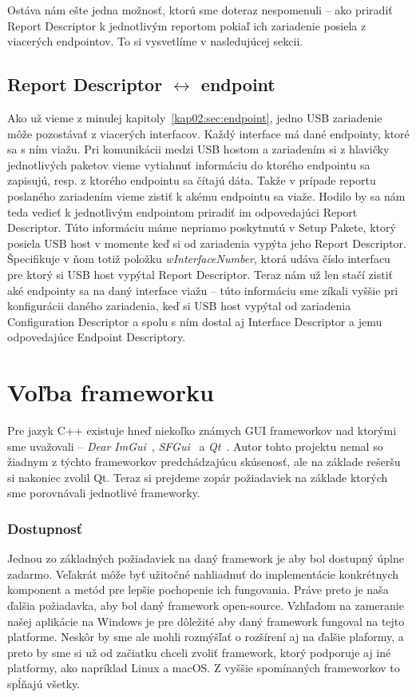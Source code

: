 Ostáva nám ešte jedna možnosť, ktorú sme doteraz nespomenuli -- ako priradiť Report Descriptor k jednotlivým reportom pokiaľ ich zariadenie posiela z viacerých endpointov. To si vysvetlíme v nasledujúcej sekcii.

\subsection*{Report Descriptor $\longleftrightarrow$ endpoint}
Ako už vieme z minulej kapitoly~\ref{kap02:sec:endpoint}, jedno USB zariadenie môže pozostávať z viacerých interfacov. Každý interface má dané endpointy, ktoré sa s ním viažu. Pri komunikácii medzi USB hostom a zariadením si z hlavičky jednotlivých paketov vieme vytiahnuť informáciu do ktorého endpointu sa zapisujú, resp. z ktorého endpointu sa čítajú dáta. Takže v prípade reportu poslaného zariadením vieme zistiť k akému endpointu sa viaže. Hodilo by sa nám teda vedieť k jednotlivým endpointom priradiť im odpovedajúci Report Descriptor. Túto informáciu máme nepriamo poskytnutú v Setup Pakete, ktorý posiela USB host v momente keď si od zariadenia vypýta jeho Report Descriptor. Špecifikuje v ňom totiž položku \textit{wInterfaceNumber}, ktorá udáva číslo interfacu pre ktorý si USB host vypýtal Report Descriptor. Teraz nám už len stačí zistiť aké endpointy sa na daný interface viažu -- túto informáciu sme zíkali vyššie pri konfigurácii daného zariadenia, keď si USB host vypýtal od zariadenia Configuration Descriptor a spolu s ním dostal aj Interface Descriptor a jemu odpovedajúce Endpoint Descriptory.



\section{Voľba frameworku}
Pre jazyk C++ existuje hneď niekoľko známych GUI frameworkov nad ktorými sme uvažovali -- \textit{Dear ImGui}~\cite{dearimgui}, \textit{SFGui}~\cite{sfgui} a \textit{Qt}~\cite{qt}. Autor tohto projektu nemal so žiadnym z týchto frameworkov predchádzajúcu skúsenosť, ale na základe rešeršu si nakoniec zvolil Qt. Teraz si prejdeme zopár požiadaviek na základe ktorých sme porovnávali jednotlivé frameworky.

\subsubsection*{Dostupnosť}
Jednou zo základných požiadaviek na daný framework je aby bol dostupný úplne zadarmo. Veľakrát môže byť užitočné nahliadnuť do implementácie konkrétnych komponent a metód pre lepšie pochopenie ich fungovania. Práve preto je naša ďalšia požiadavka, aby bol daný framework open-source. Vzhľadom na zameranie našej aplikácie na Windows je pre dôležité aby daný framework fungoval na tejto platforme. Neskôr by sme ale mohli rozmýšľať o rozšírení aj na ďalšie plaformy, a preto by sme si už od začiatku chceli zvoliť framework, ktorý podporuje aj iné platformy, ako napríklad Linux a macOS. Z vyššie spomínaných frameworkov to spĺňajú všetky.

